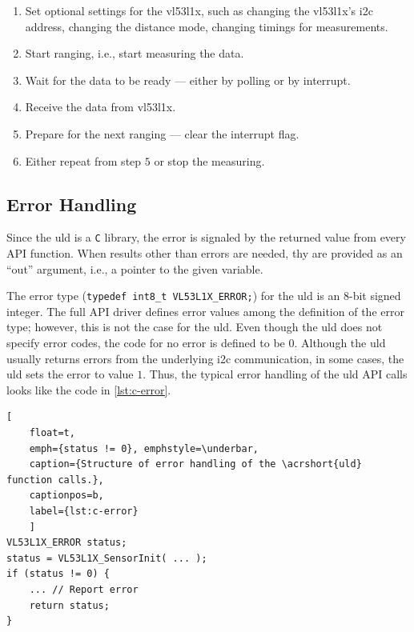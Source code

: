 \documentclass[
  digital,     %
  oneside,     %
  nosansbold,  %
  nocolorbold, %
  nolof,         %
  nolot,         %
]{fithesis4}
\begin{document}
{{{\begin{enumerate}
    \item  Set optional settings for the \gls{vl53l1x}, such as changing the \gls{vl53l1x}'s \acrshort{i2c} address, changing the distance mode, changing timings for measurements.
    
    \item Start ranging, i.e., start measuring the data.
    
    \item Wait for the data to be ready --- either by polling or by interrupt.
    
    \item Receive the data from \gls{vl53l1x}.
    
    \item Prepare for the next ranging --- clear the interrupt flag.
    
    \item Either repeat from step $5$ or stop the measuring.
\end{enumerate}


\subsection{ Error Handling } \label{sec:uld-err}

Since the \acrshort{uld} is a \verb|C| library, the error is signaled by the returned value from every API function. When results other than errors are needed, thy are provided as an ``out'' argument, i.e., a pointer to the given variable.

The error type (\lstinline[breaklines=false]|typedef int8_t VL53L1X_ERROR;|) for the \acrshort{uld} is an 8-bit signed integer. The full API driver defines error values among the definition of the error type; however, this is not the case for the \acrshort{uld}. Even though the \acrshort{uld} does not specify error codes, the code for no error is defined to be $0$. Although the \acrshort{uld} usually returns errors from the underlying \acrshort{i2c} communication, in some cases, the \acrshort{uld} sets the error to value $1$. Thus, the typical error handling of the \acrshort{uld} API calls looks like the code in \autoref{lst:c-error}.

\begin{lstlisting}[
    float=t,
    emph={status != 0}, emphstyle=\underbar,
    caption={Structure of error handling of the \acrshort{uld} function calls.},
    captionpos=b,
    label={lst:c-error}
    ]
VL53L1X_ERROR status;
status = VL53L1X_SensorInit( ... );
if (status != 0) {
    ... // Report error
    return status;
}


\end{lstlisting}}}}
\end{document}
